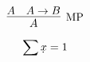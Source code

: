 \documentclass{article}
\begin{document}
\[\infer[$MP$]{A}{A & A \to B}\]
\begin{equation*}
\sum \underaccent{$\text{.}$}{x} = 1
\end{equation*}
\end{document}
